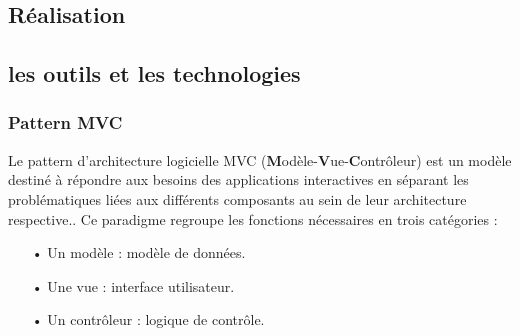 \documentclass[a4paper]{report}
\begin{document}
\begin{spacing}{2}


 

 

 

 



\chapter{Réalisation}
\section{les outils et les technologies}

\subsection{Pattern MVC}
Le pattern d'architecture logicielle MVC (\textbf{M}odèle-\textbf{V}ue-\textbf{C}ontrôleur) est un modèle destiné à répondre aux besoins des applications interactives en séparant les problématiques liées aux différents composants au sein de leur architecture respective..
Ce paradigme regroupe les fonctions nécessaires en trois catégories :\\
\begin{itemize}
\item[•] Un modèle : modèle de données.
\item[•] Une vue : interface utilisateur.
\item[•] Un contrôleur : logique de contrôle.\vspace{0.1cm}\\
\end{itemize}


\end{spacing}
\end{document}
